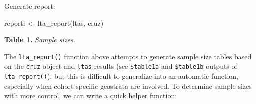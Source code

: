 \documentclass[
]{book}
\newenvironment{Shaded}{\begin{snugshade}}{\end{snugshade}}
\newcommand{\FunctionTok}[1]{\textcolor[rgb]{0.00,0.00,0.00}{#1}}
\newcommand{\NormalTok}[1]{#1}
\newcommand{\OtherTok}[1]{\textcolor[rgb]{0.56,0.35,0.01}{#1}}
\begin{document}
Generate report:

\begin{Shaded}
\begin{Highlighting}[]
\NormalTok{reporti }\OtherTok{\textless{}{-}} \FunctionTok{lta\_report}\NormalTok{(ltas, cruz)}
\end{Highlighting}
\end{Shaded}

\textbf{Table 1.} \emph{Sample sizes.}

The \texttt{lta\_report()} function above attempts to generate sample size tables based on the \texttt{cruz} object and \texttt{ltas} results (see \texttt{\$table1a} and \texttt{\$table1b} outputs of \texttt{lta\_report()}), but this is difficult to generalize into an automatic function, especially when cohort-specific geostrata are involved. To determine sample sizes with more control, we can write a quick helper function:
\end{document}
